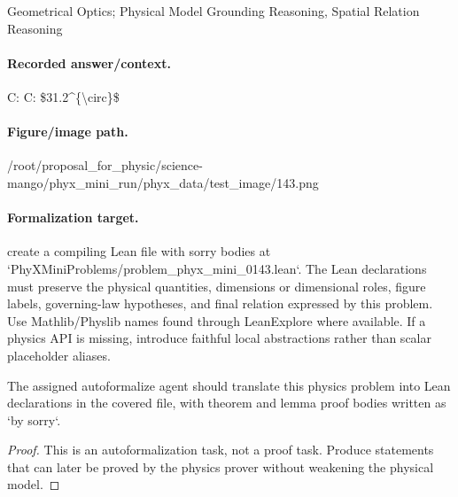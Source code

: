 Geometrical Optics; Physical Model Grounding Reasoning, Spatial Relation Reasoning

\paragraph{Recorded answer/context.}
C: C: \$31.2\textasciicircum{}\{\textbackslash{}circ\}\$

\paragraph{Figure/image path.}
/root/proposal\_for\_physic/science-mango/phyx\_mini\_run/phyx\_data/test\_image/143.png

\paragraph{Formalization target.}
create a compiling Lean file with sorry bodies at `PhyXMiniProblems/problem\_phyx\_mini\_0143.lean`. The Lean declarations must preserve the physical quantities, dimensions or dimensional roles, figure labels, governing-law hypotheses, and final relation expressed by this problem.
Use Mathlib/Physlib names found through LeanExplore where available. If a physics API is missing, introduce faithful local abstractions rather than scalar placeholder aliases.

\begin{theorem}
\label{thm:physics:phyx_mini_0143:target}
The assigned autoformalize agent should translate this physics problem into Lean declarations in the covered file, with theorem and lemma proof bodies written as `by sorry`.
\end{theorem}
\begin{proof}
This is an autoformalization task, not a proof task. Produce statements that can later be proved by the physics prover without weakening the physical model.
\end{proof}

